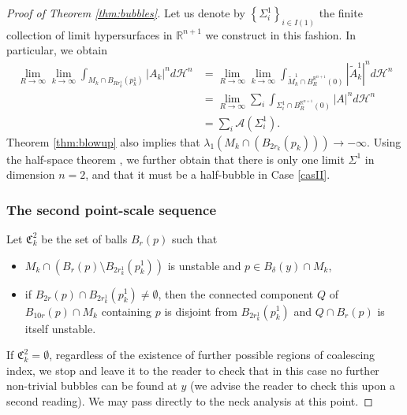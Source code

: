 \documentclass[JEP,XML,SOM,Unicode]{cedram}
\let\mathcal\mathscr
\newcounter{cas}
\theoremstyle{definition}
\newcommand{\R}{\mathbb{R}}
\newcommand{\h}{\mathscr{H}}
\begin{document}
\begin{proof}[Proof of Theorem \ref{thm:bubbles}]
Let us denote by $\left\{\Sigma^1_i\right\}_{i\in I(1)}$ the finite collection of limit hypersurfaces in $\R^{n+1}$ we construct in this fashion. In particular, we obtain
\begin{equation}\label{eq.firstbubble}
\begin{aligned}
\lim_{R\to \infty} \lim_{k\to \infty} \int_{M_k\cap B_{Rr^1_k}(p^1_k)} |A_k|^n d \h^n &= \lim_{R\to \infty} \lim_{k\to \infty} \int_{\widetilde{M}^1_k\cap B^{\R^{n+1}}_{R}(0)} |\widetilde{A}^1_k|^n d \h^n\\
&= \lim_{R\to \infty}\sum_i \int_{\Sigma^1_i \cap B^{\R^{n+1}}_R(0)} |A|^n d \h^n \\
&= \sum_i\mathcal{A}(\Sigma^1_i).
\end{aligned}
\end{equation}
Theorem \ref{thm:blowup} also implies that $\lambda_1(M_k \cap (B_{2r_k}(p_k)))\to -\infty$. Using the half-space theorem \cite{HM90}, we further obtain that there is only one limit $\Sigma^1$ in dimension $n=2$, and that it must be a half-bubble in Case \ref{casII}. 

\subsubsection*{The second point-scale sequence}
Let $\mathfrak{C}^2_k$ be the set of balls $B_r(p)$ such that \begin{itemize}
\item
$M_k\cap (B_r(p)\setminus B_{2r^1_k}(p^1_k))$ is unstable and $p\in B_\delta (y)\cap M_k$,
\item
if $B_{2r}(p)\cap B_{2r^1_k}(p^1_k)\neq\emptyset$, then the connected component $Q$ of $B_{10r}(p)\cap M_k$ containing $p$ is disjoint from $B_{2r^1_k}(p^1_k)$ and $Q\cap B_{r}(p)$ is itself unstable.
\end{itemize}

If $\mathfrak{C}^2_k = \emptyset$, regardless of the existence of further possible regions of coalescing index, we stop and leave it to the reader to check that in this case no further non-trivial bubbles can be found at $y$ (we advise the reader to check this upon a second reading). We may pass directly to the neck analysis at this point.


\end{proof}
\end{document}
